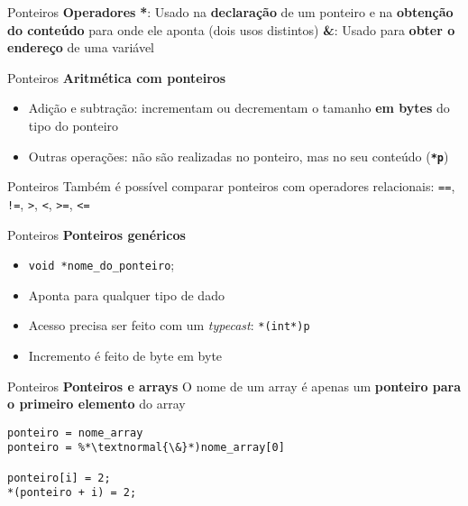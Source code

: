 \documentclass[10pt]{beamer}
\begin{document}
\begin{frame}{Ponteiros}
  \huge
  \textbf{Operadores}
  \vfill
  \Large
  \textbf{*}: Usado na \textbf{declaração} de um ponteiro e na \textbf{obtenção do conteúdo} para onde ele aponta (\alert{dois usos distintos})
  \vfill
  \Large
  \textbf{\&}: Usado para \textbf{obter o endereço} de uma variável
\end{frame}

\begin{frame}{Ponteiros}
  \huge
  \textbf{Aritmética com ponteiros}
  \vfill
  \Large
  \begin{itemize}
    \item Adição e subtração: incrementam ou decrementam o tamanho \textbf{em bytes} do tipo do ponteiro \faExclamationTriangle
    \item Outras operações: não são realizadas no ponteiro, mas no seu conteúdo (\textbf{\texttt{*p}})
  \end{itemize}

\end{frame}

\begin{frame}{Ponteiros}
  \huge
  Também é possível comparar ponteiros com operadores relacionais: \texttt{==}, \texttt{!=}, \texttt{>}, \texttt{<}, \texttt{>=}, \texttt{<=}

\end{frame}

\begin{frame}{Ponteiros}
  \huge
  \textbf{Ponteiros genéricos}
  \vfill
  \large
  \begin{itemize}
    \item \texttt{void *nome\_do\_ponteiro};
    \item Aponta para qualquer tipo de dado \faExclamationTriangle
    \item Acesso precisa ser feito com um \textit{typecast}: \texttt{*(int*)p}
    \item Incremento é feito de byte em byte
  \end{itemize}
\end{frame}

\begin{frame}[fragile]{Ponteiros}
  \huge
  \textbf{Ponteiros e arrays}
  \vfill
  \Large
  O nome de um array é apenas um \textbf{ponteiro para o primeiro elemento} do array
  \vfill
  \large
  \begin{lstlisting}
ponteiro = nome_array
ponteiro = %*\textnormal{\&}*)nome_array[0]

ponteiro[i] = 2;
*(ponteiro + i) = 2;
  \end{lstlisting}
\end{frame}
\end{document}
